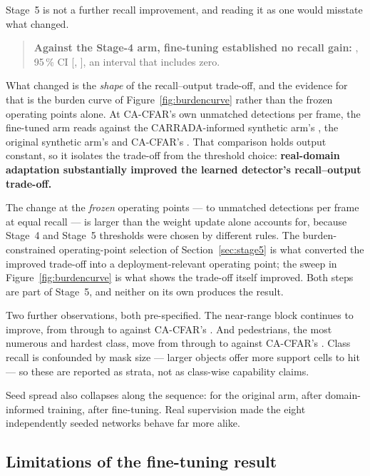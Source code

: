 Stage~5 is not a further recall improvement, and reading it as one would misstate what changed.

\begin{quote}
\textbf{Against the Stage-4 arm, fine-tuning established no recall gain:} \FtVsCiDelta{}, 95\,\% CI
[\FtVsCiCIlo{}, \FtVsCiCIhi{}], an interval that includes zero.
\end{quote}

What changed is the \emph{shape} of the recall--output trade-off, and the evidence for that is the
burden curve of Figure~\ref{fig:burdencurve} rather than the frozen operating points alone. At
CA-CFAR's own \FtMatchedBurden{} unmatched detections per frame, the fine-tuned arm reads
\FtMatchedFt{} against the CARRADA-informed synthetic arm's \FtMatchedCi{}, the original synthetic
arm's \FtMatchedOrig{} and CA-CFAR's \FtMatchedCFAR{}. That comparison holds output constant, so it
isolates the trade-off from the threshold choice: \textbf{real-domain adaptation substantially
improved the learned detector's recall--output trade-off.}

The change at the \emph{frozen} operating points --- \FtValBurdenCi{} to \FtValBurdenFt{} unmatched
detections per frame at equal recall --- is larger than the weight update alone accounts for, because
Stage~4 and Stage~5 thresholds were chosen by different rules. The burden-constrained
operating-point selection of Section~\ref{sec:stage5} is what converted the improved trade-off into a
deployment-relevant operating point; the sweep in Figure~\ref{fig:burdencurve} is what shows the
trade-off itself improved. Both steps are part of Stage~5, and neither on its own produces the
result.

Two further observations, both pre-specified. The near-range block continues to improve, from
\FtNearOrig{} through \FtNearCi{} to \FtNearFt{} against CA-CFAR's \FtNearCFAR{}. And pedestrians,
the most numerous and hardest class, move from \FtPedOrig{} through \FtPedCi{} to \FtPedFt{} against
CA-CFAR's \FtPedCFAR{}. Class recall is confounded by mask size --- larger objects offer more support
cells to hit --- so these are reported as strata, not as class-wise capability claims.

Seed spread also collapses along the sequence: \FtSeedSDOrig{} for the original arm, \FtSeedSDCi{}
after domain-informed training, \FtSeedSDFt{} after fine-tuning. Real supervision made the eight
independently seeded networks behave far more alike.

\subsection{Limitations of the fine-tuning result}
\label{sec:stage5limits}

